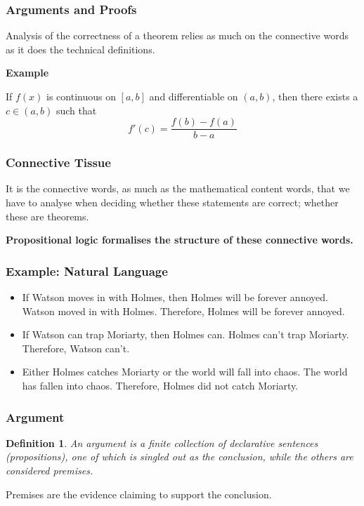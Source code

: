 \documentclass{beamer}
\theoremstyle{indentDefn} \newtheorem{defn}[]{Definition}
\begin{document}
  \begin{frame}
	\frametitle{Arguments and Proofs}
  
	Analysis of the correctness of a theorem relies as much on the connective words as it does the technical definitions. 
   
	{\bf Example}
	
	If $f(x)$ is continuous on $[a,b]$ and differentiable on $(a,b)$, then there exists a $c \in (a,b)$ such that $$f'(c) = \frac{f(b)-f(a)}{b-a}$$
  
  \end{frame}

\begin{frame}
	\frametitle{Connective Tissue}

	It is the connective words, as much as the mathematical content words, that we have to analyse when deciding whether these statements are correct; whether these are theorems.

	\vspace{0.5cm}

	{\bf Propositional logic formalises the structure of these connective words.}

\end{frame}

\begin{frame}
	\frametitle{Example: Natural Language}
	
	\begin{itemize}
		\item If Watson moves in with Holmes, then Holmes will be forever annoyed. Watson moved in with Holmes. Therefore, Holmes will be forever annoyed.
		\vspace{1cm}
		\item If Watson can trap Moriarty, then Holmes can. Holmes can't trap Moriarty. Therefore, Watson can't.
		\vspace{1cm}
		\item Either Holmes catches Moriarty or the world will fall into chaos. The world has fallen into chaos. Therefore, Holmes did not catch Moriarty.
		
	\end{itemize}	
\end{frame}


\begin{frame}
	\frametitle{Argument}
	

	\begin{defn}
		An argument is a finite collection of declarative sentences (propositions), one of which is singled out as the conclusion, while the others are considered premises. 
	\end{defn}
		 
	\vspace{0.5cm}
	
	Premises are the evidence claiming to support the conclusion.	

\end{frame}
\end{document}

